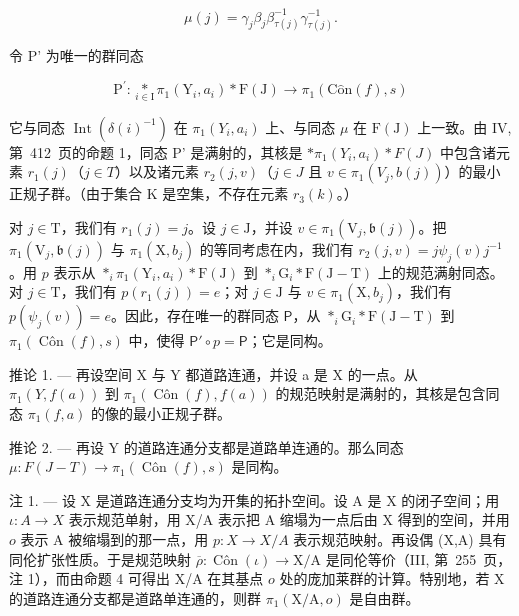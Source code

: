 \[
\mu (j) = \gamma_ {j} \beta_ {j} \beta_ {\tau (j)} ^ {- 1} \gamma_ {\tau (j)} ^ {- 1}.
\]

令 P' 为唯一的群同态

\[
\mathrm{P} ^ {\prime} \colon \underset {i \in \mathrm{I}} {*} \pi_ {1} (\mathrm{Y} _ {i}, a _ {i}) * \mathrm{F} (\mathrm{J}) \to \pi_ {1} (\mathrm{C} \hat {\mathrm{o}} \mathrm{n} (f), s)
\]

它与同态 \(\operatorname{Int}(\delta(i)^{-1})\) 在 \(\pi_1(Y_i, a_i)\) 上、与同态 \(\mu\) 在 \(\mathrm{F}(\mathrm{J})\) 上一致。由 IV, 第~412~页的命题 1，同态 P' 是满射的，其核是 \(*\pi_1(Y_i, a_i) * F(J)\) 中包含诸元素 \(r_1(j)\)（\(j \in T\)）以及诸元素 \(r_{2}(j, v)\)（\(j \in J\) 且 \(v \in \pi_{1}(V_{j}, b(j))\)）的最小正规子群。（由于集合 K 是空集，不存在元素 \(r_{3}(k)\)。）

对 \(j \in \mathrm{T}\)，我们有 \(r_1(j) = j\)。设 \(j \in \mathrm{J}\)，并设 \(v \in \pi_1(\mathrm{V}_j, \mathfrak{b}(j))\)。把 \(\pi_1(\mathrm{V}_j, \mathfrak{b}(j))\) 与 \(\pi_1(\mathrm{X}, b_j)\) 的等同考虑在内，我们有 \(r_2(j, v) = j\psi_j(v)j^{-1}\)。用 \(p\) 表示从 \(*_{i}\pi_1(\mathrm{Y}_i, a_i) * \mathrm{F}(\mathrm{J})\) 到 \(*_{i}\mathrm{G}_{i} * \mathrm{F}(\mathrm{J} - \mathrm{T})\) 上的规范满射同态。对 \(j \in \mathrm{T}\)，我们有 \(p(r_1(j)) = e\)；对 \(j \in \mathrm{J}\) 与 \(v \in \pi_1(\mathrm{X}, b_j)\)，我们有 \(p(\psi_j(v)) = e\)。因此，存在唯一的群同态 \(\mathsf{P}\)，从 \(*_{i}\mathrm{G}_{i} * \mathrm{F}(\mathrm{J} - \mathrm{T})\) 到 \(\pi_1(\operatorname{Côn}(f), s)\) 中，使得 \(\mathsf{P}' \circ p = \mathsf{P}\)；它是同构。

推论 1. --- 再设空间 X 与 Y 都道路连通，并设 a 是 X 的一点。从 \(\pi_1(Y, f(a))\) 到 \(\pi_1(\operatorname{Côn}(f), f(a))\) 的规范映射是满射的，其核是包含同态 \(\pi_1(f, a)\) 的像的最小正规子群。

推论 2. --- 再设 Y 的道路连通分支都是道路单连通的。那么同态 \(\mu\colon F(J-T)\to\pi_{1}(\operatorname{Côn}(f),s)\) 是同构。

注 1. --- 设 X 是道路连通分支均为开集的拓扑空间。设 A 是 X 的闭子空间；用 \(\iota\colon A\to X\) 表示规范单射，用 X/A 表示把 A 缩塌为一点后由 X 得到的空间，并用 \(o\) 表示 A 被缩塌到的那一点，用 \(p\colon X\to X / A\) 表示规范映射。再设偶 (X,A) 具有同伦扩张性质。于是规范映射 \(\overline{\rho}\colon \operatorname{Côn}(\iota)\to \mathrm{X} / \mathrm{A}\) 是同伦等价（III, 第~255~页，注 1），而由命题 4 可得出 X/A 在其基点 \(o\) 处的庞加莱群的计算。特别地，若 X 的道路连通分支都是道路单连通的，则群 \(\pi_1(\mathrm{X / A},o)\) 是自由群。

